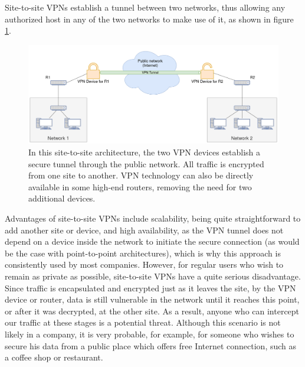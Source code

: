 \documentclass[a4paper,12pt]{report}
\begin{document}
		Site-to-site VPNs establish a tunnel between two networks, thus allowing any authorized host in any of the two networks to make use of it, as shown in figure \ref{fig:site-to-site_VPN}.
		\begin{figure}[h]
			\includegraphics[width=\textwidth]{site-to-site_VPN}
			\centering
			\caption{In this site-to-site architecture, the two VPN devices establish a secure tunnel through the public network. All traffic is encrypted from one site to another. VPN technology can also be directly available in some high-end routers, removing the need for two additional devices.}
			\label{fig:site-to-site_VPN}
		\end{figure}
		
		Advantages of site-to-site VPNs include scalability, being quite straightforward to add another site or device, and high availability, as the VPN tunnel does not depend on a device inside the network to initiate the secure connection (as would be the case with point-to-point architectures), which is why this approach is consistently used by most companies. However, for regular users who wish to remain as private as possible, site-to-site VPNs have a quite serious disadvantage. Since traffic is encapsulated and encrypted just as it leaves the site, by the VPN device or router, data is still vulnerable in the network until it reaches this point, or after it was decrypted, at the other site. As a result, anyone who can intercept our traffic at these stages is a potential threat. Although this scenario is not likely in a company, it is very probable, for example, for someone who wishes to secure his data from a public place which offers free Internet connection, such as a coffee shop or restaurant.
\end{document}
